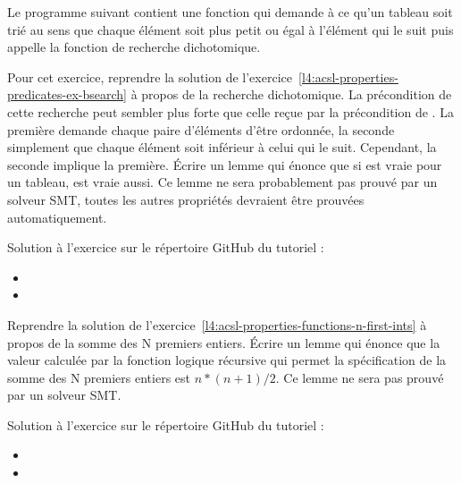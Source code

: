 Le programme suivant contient une fonction qui demande à ce qu'un tableau soit
trié au sens que chaque élément soit plus petit ou égal à l'élément qui le suit
puis appelle la fonction de recherche dichotomique.




Pour cet exercice, reprendre la solution de
l'exercice~\ref{l4:acsl-properties-predicates-ex-bsearch} à propos de la recherche
dichotomique. La précondition de cette recherche peut sembler plus forte que celle
reçue par la précondition de . La première demande
chaque paire d'éléments d'être ordonnée, la seconde simplement que chaque élément
soit inférieur à celui qui le suit. Cependant, la seconde implique la première.
Écrire un lemme qui énonce que si  est vraie
pour un tableau,  est vraie aussi. Ce lemme ne sera probablement
pas prouvé par un solveur SMT, toutes les autres propriétés devraient être prouvées
automatiquement.


\begin{Information}
  Solution à l'exercice sur le répertoire GitHub du tutoriel :
  \begin{itemize}
    \item {}
    \item {}
  \end{itemize}
\end{Information}


\label{l4:acsl-properties-lemmas-n-first-ints}


Reprendre la solution de l'exercice~\ref{l4:acsl-properties-functions-n-first-ints}
à propos de la somme des N premiers entiers. Écrire un lemme qui énonce que la valeur
calculée par la fonction logique récursive qui permet la spécification de la somme des
N premiers entiers est $n*(n+1)/2$. Ce lemme ne sera pas prouvé par un solveur SMT.


\begin{Information}
  Solution à l'exercice sur le répertoire GitHub du tutoriel :
  \begin{itemize}
    \item {}
    \item {}
  \end{itemize}
\end{Information}


